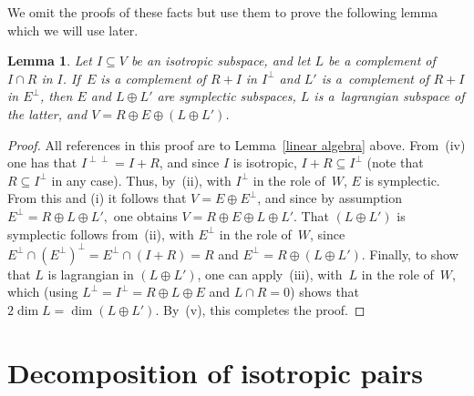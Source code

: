 \documentclass[10pt,a4paper]{amsart}
\numberwithin{equation}{section}
\newtheorem{Lemma}[Theorem]{Lemma}
\begin{document}
We omit the proofs of these facts but use them to prove the following lemma which we will use later.

\begin{Lemma}\label{reduction}
Let $I \subseteq V$ be an isotropic subspace, and let $L$ be a complement of $I \cap R$ in $I$. If~$E$ is a complement of $R + I$ in $I^{\perp}$ and $L'$ is a~complement of $R + I$ in $E^{\perp}$, then $E$ and $L \oplus L'$ are symplectic subspaces, $L$ is a~lagrangian subspace of the latter, and $V = R \oplus E \oplus (L \oplus L')$.
\end{Lemma}

\begin{proof}
All references in this proof are to Lemma~\ref{linear algebra} above. From~(iv) one has that $I^{\perp \perp} = I + R$, and since $I$ is isotropic, $I + R \subseteq I^{\perp}$ (note that $R \subseteq I^{\perp}$ in any case). Thus, by~(ii), with $I^{\perp}$ in the role of~$W$, $E$ is symplectic. From this and (i) it follows that $V = E \oplus E^{\perp}$, and since by assumption $E^{\perp} = R \oplus L \oplus L',$ one obtains $V = R \oplus E \oplus L \oplus L'$. That $(L \oplus L')$ is symplectic follows from~(ii), with $E^{\perp}$ in the role of~$W$, since $E^{\perp} \cap (E^{\perp})^{\perp} = E^{\perp} \cap (I + R) = R$ and $E^{\perp} = R \oplus (L \oplus L')$. Finally, to show that $L$ is lagrangian in $(L \oplus L')$, one can apply~(iii), with~$L$ in the role of~$W$, which (using $L^{\perp} = I^{\perp} = R \oplus L \oplus E$ and $L \cap R = 0$) shows that $2 \dim L = \dim (L \oplus L')$. By~(v), this completes the proof.
\end{proof}

\section{Decomposition of isotropic pairs}\label{decomposition}
\end{document}
